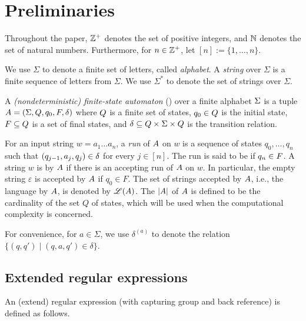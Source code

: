 
\section{Preliminaries}

Throughout the paper, $\mathbb{Z}^+$ denotes the set of positive integers, and  $\mathbb{N}$ denotes the set of natural numbers. Furthermore, for $n\in \mathbb{Z}^+$, let $[n]:=\{1, \ldots, n\}$. 

We use $\Sigma$ to denote a finite set of letters, called \emph{alphabet}. A \emph{string} over $\Sigma$ is a finite sequence of letters from $\Sigma$. We use $\Sigma^*$ to denote the set of strings over $\Sigma$. 

\begin{definition} \label{def:nfa}
	A \emph{(nondeterministic) finite-state automaton}
	(\FA{}) over a finite alphabet $\Sigma$ is a tuple ${A} =
	(\Sigma, Q, q_0, F, \delta)$ where 
	$Q$ is a finite set of 
	states, $q_0\in Q$ is
	the initial state, $F\subseteq Q$ is a set of final states, and 
	$\delta\subseteq Q \times 
	\Sigma \times  Q$ is the
	transition relation. 
\end{definition}

For an input string $w=a_1 \dots a_n$, a \emph{run} of ${A}$ on $w$
is a sequence of states $q_0, \ldots, q_n$ such that $(q_{j-1}, a_{j}, q_{j}) \in
\delta$  for every $j \in [n]$.
The run is said to be  if $q_n \in F$.
A string $w$ is  by ${A}$ if there is an accepting run of
${A}$ on $w$. In particular, the empty string $\varepsilon$ is accepted by ${A}$ if $q_0 \in F$. The set of strings accepted by ${A}$, i.e., the language  by ${A}$, is denoted by $\mathscr{L}({A})$.
The  $|{A}|$ of ${A}$ is defined to be the cardinality of the set $Q$ of states, which will be 
used when the computational complexity is concerned.

For convenience, for $a \in \Sigma$, we use $\delta^{(a)}$ to denote the  relation $\{(q, q') \mid (q, a, q') \in \delta\}$.


  
 \subsection{Extended regular expressions}
An (extend) regular expression (with capturing group and back reference) is defined as follows.
  
